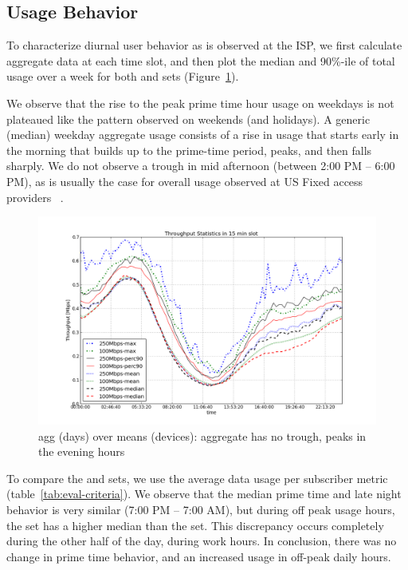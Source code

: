 \subsection{Usage Behavior}
\label{subsec:behavior}

To characterize diurnal user behavior as is observed at the ISP, we first calculate
aggregate data at each time slot, and then plot the median and 90\%-ile of total
usage over a week for both \test and \control sets (Figure~\ref{fig:TS-data-rate-daily}).

We observe that the rise to the peak prime time hour usage on weekdays
is not plateaued like the pattern observed on weekends (and holidays).
A generic (median) weekday aggregate usage consists of a rise in usage that starts
early in the morning that builds up to the prime-time period, peaks, and then falls sharply.
We do not observe a trough in mid afternoon (between 2:00 PM -- 6:00 PM), as is usually
the case for overall usage observed at US Fixed access providers ~\cite{sandvine2014report1}.

\begin{figure}[ht!]
\begin{minipage}{\linewidth}
  \centering
  \includegraphics[width=\linewidth]{figures/describe-total-throughput-per-day[replace].png}
  \caption{agg (days) over means (devices): aggregate has no trough, peaks in the evening hours}
  \label{fig:TS-data-rate-daily}
\end{minipage}
\end{figure}

To compare the \test and \control sets, we use the average data usage per subscriber
metric (table~\ref{tab:eval-criteria}). We observe that the median prime time and late night
behavior is very similar (7:00 PM -- 7:00 AM), but during off peak usage hours, the \test
set has a higher median than the \control set. This discrepancy occurs completely during the
other half of the day, during work hours. In conclusion, there was no change in
prime time behavior, and an increased usage in off-peak daily hours.


